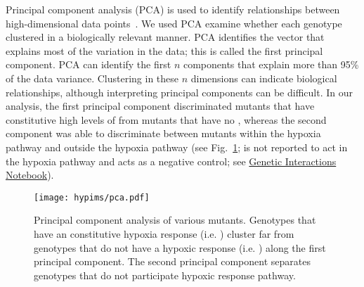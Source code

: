 Principal component analysis (PCA) is used to identify relationships between
high-dimensional data points~\citep{Yeung2001}. We used PCA
examine whether each genotype clustered in a biologically relevant manner. PCA
identifies the vector that explains most of the variation in the data; this
is called the first principal component. PCA can identify the first
$n$ components that explain more than 95\% of the data variance.
Clustering in these $n$ dimensions can indicate biological
relationships, although interpreting principal components can be
difficult.
In our analysis, the first principal component discriminated mutants
that have constitutive high levels of \hifp{} from mutants that have no \hifp{},
whereas the second component was able to discriminate between mutants within the
hypoxia pathway and outside the hypoxia pathway (see Fig.~\ref{fig:pca};
 is not reported to act in the hypoxia pathway and acts as a
negative control; see
\href{https://wormlabcaltech.github.io/mprsq/analysis_notebooks/2_predict_interactions.html}
{Genetic Interactions Notebook}).

\begin{figure}[tbhp]
  \centering
  \texttt{[image: hypims/pca.pdf]}
  \caption{
    Principal component analysis of various \cel{} mutants. Genotypes that have
    an constitutive hypoxia response (i.e. \egl{}) cluster far from genotypes
    that do not have a hypoxic response (i.e. \hif{}) along the first principal
    component. The second principal component separates genotypes that do not
    participate hypoxic response pathway.
  }
\label{fig:pca}
\end{figure}

